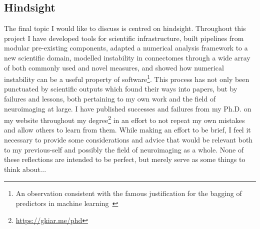 \subsection{Hindsight}
The final topic I would like to discuss is centred on hindsight. Throughout this project I have developed tools
for scientific infrastructure, built pipelines from modular pre-existing components, adapted a numerical analysis
framework to a new scientific domain, modelled instability in connectomes through a wide array of both commonly
used and novel measures, and showed how numerical instability can be a useful property of software\footnote{An
observation consistent with the famous justification for the bagging of predictors in machine
learning~\cite{breiman1996bagging}}. This process has not only been punctuated by scientific outputs which found
their ways into papers, but by failures and lessons, both pertaining to my own work and the field of neuroimaging
at large. I have published successes and failures from my Ph.D. on my website throughout my
degree\footnote{\url{https://gkiar.me/phd}} in an effort to not repeat my own mistakes and allow others to learn
from them. While making an effort to be brief, I feel it necessary to provide some considerations and advice that
would be relevant both to my previous-self and possibly the field of neuroimaging as a whole. None of these
reflections are intended to be perfect, but merely serve as some things to think about...

